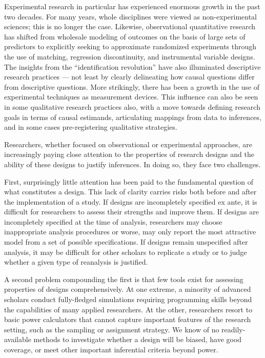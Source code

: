 \documentclass[11pt]{article}
\begin{document}
Experimental research in particular has experienced enormous growth in the past two decades. For many years, whole disciplines were viewed as non-experimental sciences; this is no longer the case. Likewise, observational quantitative research has shifted from wholesale modeling of outcomes on the basis of large sets of predictors to explicitly seeking to approximate randomized experiments through the use of matching, regression discontinuity, and instrumental variable designs. The insights from the ``identification revolution'' have also illuminated descriptive research practices --- not least by clearly delineating how causal questions differ from descriptive questions. More strikingly, there has been a growth in the use of experimental techniques as measurement devices. This influence can also be seen in some qualitative research practices also, with a move towards defining research goals in terms of causal estimands, articulating mappings from data to inferences, and in some cases pre-registering qualitative strategies. 

Researchers, whether focused on observational or experimental approaches, are increasingly paying close attention to the properties of research designs and the ability of these designs to justify inferences. In doing so, they face two challenges.  

First, surprisingly little attention has been paid to the fundamental question of what constitutes a design. This lack of clarity carries risks both before and after the implementation of a study. If designs are incompletely specified ex ante, it is difficult for researchers to assess their strengths and improve them. If designs are incompletely specified at the time of analysis, researchers may choose inappropriate analysis procedures or worse, may only report the most attractive model from a set of possible specifications. If designs remain unspecified after analysis, it may be difficult for other scholars to replicate a study or to judge whether a given type of reanalysis is justified. 

A second problem compounding the first is that few tools exist for assessing properties of designs comprehensively. At one extreme, a minority of advanced scholars conduct fully-fledged simulations requiring programming skills beyond the capabilities of many applied researchers. At the other, researchers resort to basic power calculators that cannot capture important features of the research setting, such as the sampling or assignment strategy. We know of no readily-available methods to investigate whether a design will be biased, have good coverage, or meet other important inferential criteria beyond power. 
\end{document}
